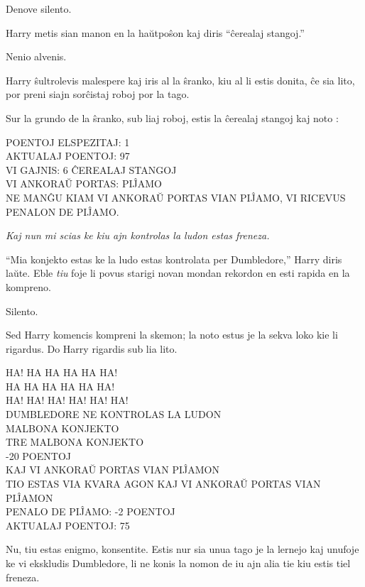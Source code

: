Denove silento.

Harry metis sian manon en la haŭtpoŝon kaj diris ``ĉerealaj stangoj.''

Nenio alvenis.

Harry ŝultrolevis malespere kaj iris al la ŝranko, kiu al li estis
donita, ĉe sia lito, por preni siajn sorĉistaj roboj por la tago.

Sur la grundo de la ŝranko, sub liaj roboj, estis la ĉerealaj stangoj
kaj noto :

\medskip
\begin{center}
  POENTOJ ELSPEZITAJ: 1\\
  AKTUALAJ POENTOJ: 97\\
  VI GAJNIS: 6 ĈEREALAJ STANGOJ\\
  VI ANKORAŬ PORTAS: PIĴAMO\\
  NE MANĜU KIAM VI ANKORAŬ PORTAS VIAN PIĴAMO, VI RICEVUS PENALON DE PIĴAMO.
\end{center}
\medskip

\emph{Kaj nun mi scias ke kiu ajn kontrolas la ludon estas freneza.}

``Mia konjekto estas ke la ludo estas kontrolata per Dumbledore,''
Harry diris laŭte. Eble \emph{tiu} foje li povus starigi novan mondan
rekordon en esti rapida en la kompreno.

Silento.

Sed Harry komencis kompreni la skemon; la noto estus je la sekva loko
kie li rigardus. Do Harry rigardis sub lia lito.

\medskip
\begin{center}
  HA! HA HA HA HA HA!\\
  HA HA HA HA HA HA!\\
  HA! HA! HA! HA! HA! HA!\\
  DUMBLEDORE NE KONTROLAS LA LUDON\\
  MALBONA KONJEKTO\\
  TRE MALBONA KONJEKTO\\
  -20 POENTOJ\\
  KAJ VI ANKORAŬ PORTAS VIAN PIĴAMON\\
  TIO ESTAS VIA KVARA AGON KAJ VI ANKORAŬ PORTAS VIAN PIĴAMON\\
  PENALO DE PIĴAMO: -2 POENTOJ\\
  AKTUALAJ POENTOJ: 75
\end{center}

Nu, tiu estas enigmo, konsentite. Estis nur sia unua tago je la
lernejo kaj unufoje ke vi ekskludis Dumbledore, li ne konis la nomon
de iu ajn alia tie kiu estis tiel freneza.

